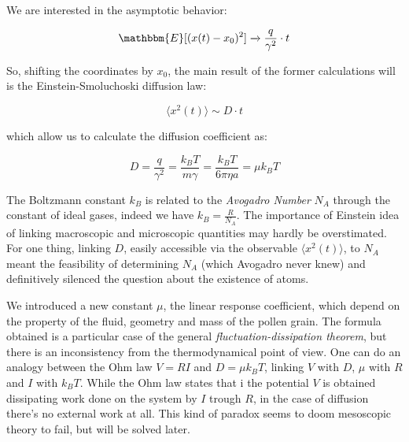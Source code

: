 \documentclass{article}
\begin{document}
We are interested in the asymptotic behavior:

\begin{equation}
 \mathbbm{E}[(x(t)-x_0)^2] \xrightarrow{} \frac{q}{\gamma^2} \cdot t
\end{equation}

So, shifting the coordinates by $x_0$, the main result of the former calculations will is the Einstein-Smoluchoski diffusion law:

\begin{equation}
\langle x^2(t) \rangle \sim D\cdot t
\end{equation}

which allow us to calculate the diffusion coefficient as:

\begin{equation}
D = \frac{q}{\gamma^2}=\frac{k_B T}{m \gamma} = \frac{k_{B} T }{6 \pi \eta a} = \mu k_B T
\end{equation}
\newline

The Boltzmann constant $k_{B}$ is related to the \textit{ Avogadro Number} $N_A $ through the constant of ideal gases, indeed we have $k_{B} = \frac{R}{N_{A}}$. 
The importance of Einstein idea of linking macroscopic and microscopic quantities may hardly be overstimated. For one thing, linking $D$, easily accessible via the observable $\langle x^2(t) \rangle$, to $N_{A}$ meant the feasibility of determining $N_{A}$ (which Avogadro never knew) and definitively silenced the question about the existence of atoms.

We introduced a new constant $\mu$, the linear response coefficient, which depend on the property of the fluid, geometry and mass of the pollen grain. The formula obtained is a particular case of the general \textit{fluctuation-dissipation theorem}, but there is an inconsistency from the thermodynamical point of view. One can do an analogy between the Ohm law $V=RI$ and $D = \mu k_B T$, linking $V$ with $D$, $\mu$ with $R$ and $I$ with $k_B T$. While the Ohm law states that i the potential $V$ is obtained dissipating work done on the system by $I$ trough $R$, in the case of diffusion there's no external work at all. This kind of paradox seems to doom mesoscopic theory to fail, but will be solved later.
\end{document}
